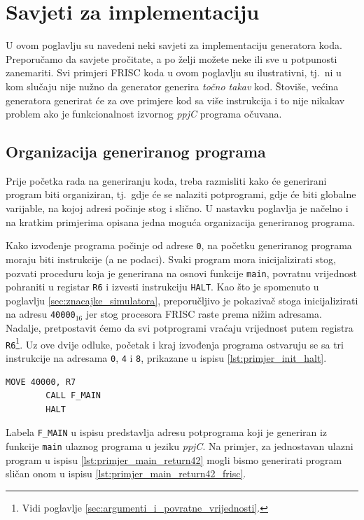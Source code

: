 \documentclass[times, 12pt, utf8]{book}
\begin{document}
\section{Savjeti za implementaciju}
U ovom poglavlju su navedeni neki savjeti za implementaciju generatora koda.
Preporučamo da savjete pročitate, a po želji možete neke ili sve u potpunosti zanemariti.
Svi primjeri FRISC koda u ovom poglavlju su ilustrativni, tj.~ni u kom slučaju nije nužno da generator generira \emph{točno takav} kod.
Štoviše, većina generatora generirat će za ove primjere kod sa više instrukcija i to nije nikakav problem ako je funkcionalnost izvornog \emph{ppjC} programa očuvana.

\subsection{Organizacija generiranog programa}
Prije početka rada na generiranju koda, treba razmisliti kako će generirani program biti organiziran, tj.~gdje će se nalaziti potprogrami, gdje će biti globalne varijable, na kojoj adresi počinje stog i slično.
U nastavku poglavlja je načelno i na kratkim primjerima opisana jedna moguća organizacija generiranog programa.

Kako izvođenje programa počinje od adrese \verb|0|, na početku generiranog programa moraju biti instrukcije (a ne podaci).
Svaki program mora inicijalizirati stog, pozvati proceduru koja je generirana na osnovi funkcije \verb|main|, povratnu vrijednost pohraniti u registar \verb|R6| i izvesti instrukciju \verb|HALT|.
Kao što je spomenuto u poglavlju \ref{sec:znacajke_simulatora}, preporučljivo je pokazivač stoga inicijalizirati na adresu \verb|40000|\(_{16}\) jer stog procesora FRISC raste prema nižim adresama.
Nadalje, pretpostavit ćemo da svi potprogrami vraćaju vrijednost putem registra \verb|R6|\footnote{Vidi poglavlje \ref{sec:argumenti_i_povratne_vrijednosti}.}.
Uz ove dvije odluke, početak i kraj izvođenja programa ostvaruju se sa tri instrukcije na adresama \verb|0|, \verb|4| i \verb|8|, prikazane u ispisu \ref{lst:primjer_init_halt}.

\begin{lstlisting}[caption={Instrukcije za inicijalizaciju i završetak izvođenja programa.},label=lst:primjer_init_halt]
        MOVE 40000, R7
        CALL F_MAIN
        HALT
\end{lstlisting}

Labela \verb|F_MAIN| u ispisu predstavlja adresu potprograma koji je generiran iz funkcije \verb|main| ulaznog programa u jeziku \emph{ppjC}.
Na primjer, za jednostavan ulazni program u ispisu \ref{lst:primjer_main_return42} mogli bismo generirati program sličan onom u ispisu \ref{lst:primjer_main_return42_frisc}.
\end{document}
